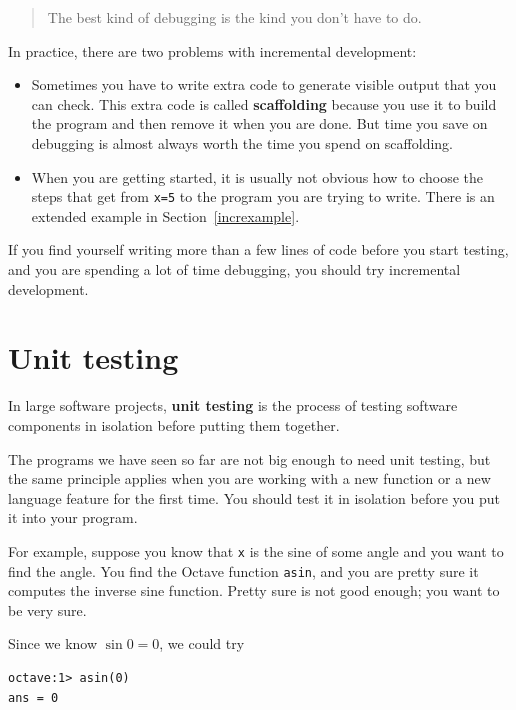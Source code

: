 \documentclass{book}
\begin{document}
\begin{quote}
The best kind of debugging is the kind you don't have to do.
\end{quote}

In practice, there are two problems with incremental development:

\begin{itemize}

\item Sometimes you have to write extra code to
generate visible output that you can check. This extra code is
called {\bf scaffolding} because you use it to build the program
and then remove it when you are done. But time you save on
debugging is almost always worth the time you spend on
scaffolding.

\item When you are getting started, it is usually not obvious how to
choose the steps that get from {\tt x=5} to the program you are trying
to write. There is an extended example in Section~\ref{increxample}.

\end{itemize}

If you find yourself writing more than a few lines of code before
you start testing, and you are spending a lot of time debugging,
you should try incremental development.


\section{Unit testing}

In large software projects, {\bf unit testing} is the process of
testing software components in isolation before putting
them together.

The programs we have seen so far are not
big enough to need unit testing, but the same principle applies
when you are working with a new function or a new language feature
for the first time. You should test it in isolation before you
put it into your program.

For example, suppose you know that {\tt x} is the sine of some
angle and you want to find the angle. You find the Octave function
{\tt asin}, and you are pretty sure it computes the inverse sine
function. Pretty sure is not good enough; you want to be very sure.

Since we know $\sin 0 = 0$, we could try

\begin{verbatim}
octave:1> asin(0)
ans = 0
\end{verbatim}
\end{document}

